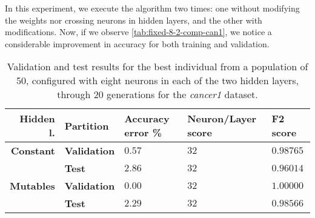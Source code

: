\documentclass[conference]{IEEEtran}\usepackage[]{graphicx}\usepackage[]{color}
\begin{document}

In this experiment, we execute the algorithm two times: one without modifying
the weights nor crossing neurons in hidden layers, and the other with
modifications. %
Now, if we observe \autoref{tab:fixed-8-2-comp-can1}, we
notice a considerable improvement in accuracy for both training and
validation. %

\begin{table*}
    \centering
    \caption{
Validation and test results for the best individual from a population of 50,
configured with eight neurons in each of the two hidden layers, through 20
generations for the \emph{cancer1} dataset.}
     \label{tab:fixed-8-2-comp-can1}
     \begin{tabular}{rllll}
         \textbf{Hidden l.} & \textbf{Partition}  & \textbf{Accuracy error \%} & \textbf{Neuron/Layer score} & \textbf{F2 score} \\
         \hline
         \textbf{Constant}  & \textbf{Validation} & $0.57$                 &        $32$             &      $0.98765$ \\
                        & \textbf{Test}       & $2.86$                 &        $32$             &      $0.96014$ \\
         \textbf{Mutables}  & \textbf{Validation} & $0.00$                 &        $32$             &      $1.00000$ \\
                        & \textbf{Test}       & $2.29$                 &        $32$             &      $0.98566$ \\
     \end{tabular}
 \end{table*}

\end{document}
